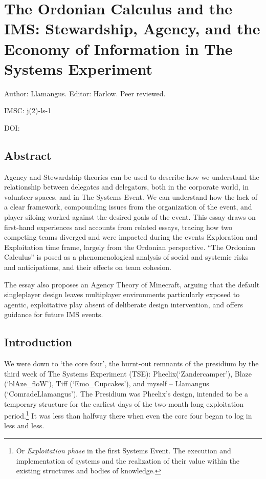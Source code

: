 \chapter{The Ordonian Calculus and the IMS: Stewardship, Agency, and the Economy of Information in The Systems Experiment}

\begin{center}
    Author: Llamangus. Editor: Harlow. Peer reviewed. %
\end{center}

\begin{flushright}
    IMSC: j(2)-ls-1

    DOI: 
\end{flushright}

\section*{Abstract}
Agency and Stewardship theories can be used to describe how we understand the relationship between delegates and delegators, both in the corporate world, in volunteer spaces, and in The Systems Event. We can understand how the lack of a clear framework, compounding issues from the organization of the event, and player siloing worked against the desired goals of the event. This essay draws on first-hand experiences and accounts from related essays, tracing how two competing teams diverged and were impacted during the events Exploration and Exploitation time frame, largely from the Ordonian perspective. “The Ordonian Calculus” is posed as a phenomenological analysis of social and systemic risks and anticipations, and their effects on team cohesion.

The essay also proposes an Agency Theory of Minecraft, arguing that the default singleplayer design leaves multiplayer environments particularly exposed to agentic, exploitative play absent of deliberate design intervention, and offers guidance for future IMS events.

\section{Introduction}
We were down to `the core four', the burnt-out remnants of the presidium by the third week of The Systems Experiment (TSE): Pheelix(`Zandercamper'), Blaze (`blAze\_floW'), Tiff (`Emo\_Cupcakes'), and myself – Llamangus (`ComradeLlamangus'). The Presidium was Pheelix's design, intended to be a temporary structure for the earliest days of the two-month long exploitation period.\footnote{Or \textit{Exploitation phase} in the first Systems Event. The execution and implementation of systems and the realization of their value within the existing structures and bodies of knowledge.} It was less than halfway there when even the core four began to log in less and less.

